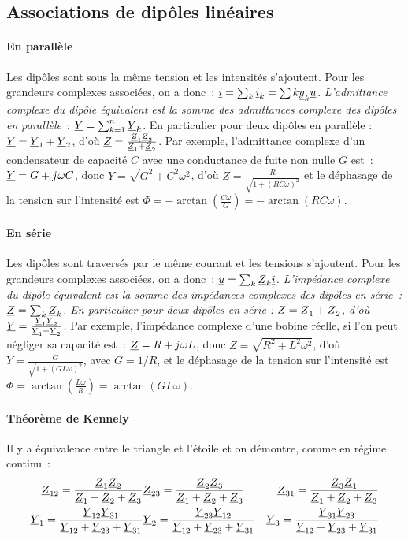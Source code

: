 \subsection{Associations de dipôles linéaires}
\paragraph{En parallèle} Les dipôles sont sous la même tension et les 
intensités s'ajoutent. Pour les grandeurs complexes associées, on a 
donc~: \(\underline{i} = \sum_k {\underline{i}}_k = \sum{k} {\underline{y}}_k \underline{u} \). 
\emph{L'admittance complexe du dipôle équivalent est la somme des 
admittances complexe des dipôles en parallèle}~: \(\underline{Y} = \sum_{k=1}^n 
\underline{Y}_k\). En particulier pour deux dipôles en parallèle : \(\underline{Y} = \underline{Y}_1 + 
\underline{Y}_2\), d'où \(\underline{Z} = \frac{\underline{Z}_1 \underline{Z}_2}{\underline{Z}_1+\underline{Z}_2}\). Par exemple, 
l'admittance complexe d'un condensateur de capacité \(C\) avec une 
conductance de fuite non nulle \(G\) est~: \(\underline{Y} = G + {j\mkern1mu}\omega C\), 
donc \(Y = \sqrt{G^2 + C^2 \omega^2}\), d'où \(Z = 
\frac{R}{\sqrt{1+(RC\omega)^2}}\) et le déphasage de la tension sur 
l'intensité est \(\Phi = -\arctan\left(\frac{C\omega}{G}\right) = 
-\arctan(RC\omega)\).

\paragraph{En série} Les dipôles sont traversés par le même courant et 
les tensions s'ajoutent. Pour les grandeurs complexes associées, on a 
donc~: \(\underline{u} = \sum_k \underline{Z}_k \underline{i}\). \emph{L'impédance complexe du dipôle 
équivalent est la somme des impédances complexes des dipôles en série~: 
\(\underline{Z} = \sum_k \underline{Z}_k\). En particulier pour deux dipôles en série : \(\underline{Z} 
= \underline{Z}_1 + \underline{Z}_2\), d'où \(\underline{Y} = \frac{\underline{Y}_1 \underline{Y}_2}{\underline{Y}_1+\underline{Y}_2}\).} Par 
exemple, l'impédance complexe d'une bobine réelle, si l'on peut négliger 
sa capacité est~: \(\underline{Z} = R + {j\mkern1mu}\omega L\), donc \(Z = 
\sqrt{R^2+L^2\omega^2}\), d'où \(Y = \frac{G}{\sqrt{1+(GL\omega)^2}}\), 
avec \(G=1/R\), et le déphasage de la tension sur l'intensité est \(\Phi 
= \arctan\left(\frac{L\omega}{R}\right) = \arctan(GL\omega)\).
\paragraph{Théorème de Kennely}
Il y a équivalence entre le triangle et l'étoile et on démontre, comme 
en régime continu~:
\begin{align}
  \underline{Z}_{12} = \frac{\underline{Z}_1\underline{Z}_2}{\underline{Z}_1 + \underline{Z}_2 + \underline{Z}_3}  & \underline{Z}_{23} = 
  \frac{\underline{Z}_2\underline{Z}_3}{\underline{Z}_1 + \underline{Z}_2 + \underline{Z}_3} & \underline{Z}_{31} = 
  \frac{\underline{Z}_3\underline{Z}_1}{\underline{Z}_1 + \underline{Z}_2 + \underline{Z}_3} \\
  \underline{Y}_1 = \frac{\underline{Y}_{12}\underline{Y}_{31}}{\underline{Y}_{12} + \underline{Y}_{23} + \underline{Y}_{31}}  & 
  \underline{Y}_2 = \frac{\underline{Y}_{23}\underline{Y}_{12}}{\underline{Y}_{12} + \underline{Y}_{23} + \underline{Y}_{31}} & 
  \underline{Y}_3 = \frac{\underline{Y}_{31}\underline{Y}_{23}}{\underline{Y}_{12} + \underline{Y}_{23} + \underline{Y}_{31}}
\end{align}
%
